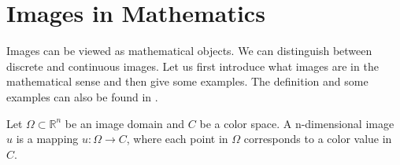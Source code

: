 \section{Images in Mathematics} %
\label{sec:images_in_mathematics}

    Images can be viewed as mathematical objects. We can distinguish between discrete and continuous images. Let us first introduce what images are in the mathematical sense and then give some examples. The definition and some examples can also be found in \cite{Bredies}.

    \begin{definition}[Image] %
    \label{def:image}

        Let $\Omega \subset \mathbb{R}^{n}$ be an image domain and $C$ be a color space. A n-dimensional image $u$ is a mapping $u: \Omega \longrightarrow C$, where each point in $\Omega$ corresponds to a color value in $C$.

    \end{definition}

